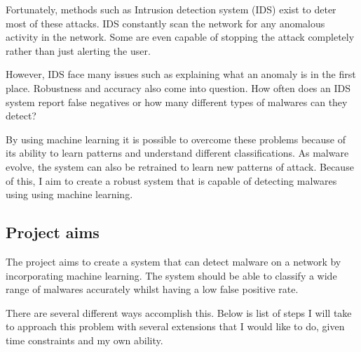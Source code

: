 \documentclass[11pt]{article}
\begin{document}
Fortunately, methods such as Intrusion detection system (IDS) exist to deter most of these attacks. IDS constantly scan the network for any anomalous activity in the network. Some are even capable of stopping the attack completely rather than just alerting the user. 

However, IDS face many issues such as explaining what an anomaly is in the first place. Robustness and accuracy also come into question. How often does an IDS system report false negatives or how many different types of malwares can they detect? 

By using machine learning it is possible to overcome these problems because of its ability to learn patterns and understand different classifications. As malware evolve, the system can also be retrained to learn new patterns of attack. Because of this, I aim to create a robust system that is capable of detecting malwares using using machine learning.

\subsection{Project aims}
The project aims to create a system that can detect malware on a network by incorporating machine learning. The system should be able to classify a wide range of malwares accurately whilst having a low false positive rate. 

There are several different ways accomplish this. Below is list of steps I will take to approach this problem with several extensions that I would like to do, given time constraints and my own ability. 
\end{document}
